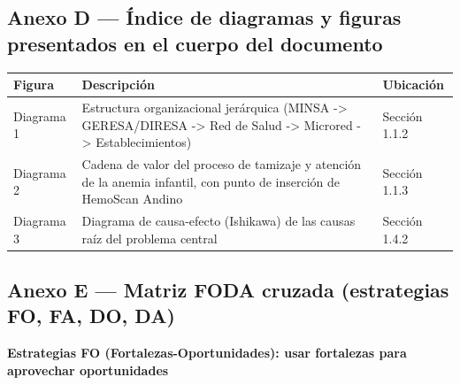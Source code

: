 \documentclass[11pt,a4paper]{article}
\begin{document}
\subsection{Anexo D --- Índice de diagramas y figuras presentados en el cuerpo del documento}\label{anexo-d-uxedndice-de-diagramas-y-figuras-presentados-en-el-cuerpo-del-documento}

{\small
\begin{longtable}[]{@{}
  >{\raggedright\arraybackslash}p{}
  >{\raggedright\arraybackslash}p{}
  >{\raggedright\arraybackslash}p{}@{}}
\toprule\noalign{}
\begin{minipage}[b]{\linewidth}\raggedright
Figura
\end{minipage} & \begin{minipage}[b]{\linewidth}\raggedright
Descripción
\end{minipage} & \begin{minipage}[b]{\linewidth}\raggedright
Ubicación
\end{minipage} \\
\midrule\noalign{}
\endhead
\bottomrule\noalign{}
\endlastfoot
Diagrama 1 & Estructura organizacional jerárquica (MINSA -\textgreater{} GERESA/DIRESA -\textgreater{} Red de Salud -\textgreater{} Microred -\textgreater{} Establecimientos) & Sección 1.1.2 \\
Diagrama 2 & Cadena de valor del proceso de tamizaje y atención de la anemia infantil, con punto de inserción de HemoScan Andino & Sección 1.1.3 \\
Diagrama 3 & Diagrama de causa-efecto (Ishikawa) de las causas raíz del problema central & Sección 1.4.2 \\
\end{longtable}
}

\subsection{Anexo E --- Matriz FODA cruzada (estrategias FO, FA, DO, DA)}\label{anexo-e-matriz-foda-cruzada-estrategias-fo-fa-do-da}

\textbf{Estrategias FO (Fortalezas-Oportunidades): usar fortalezas para aprovechar oportunidades}
\end{document}
